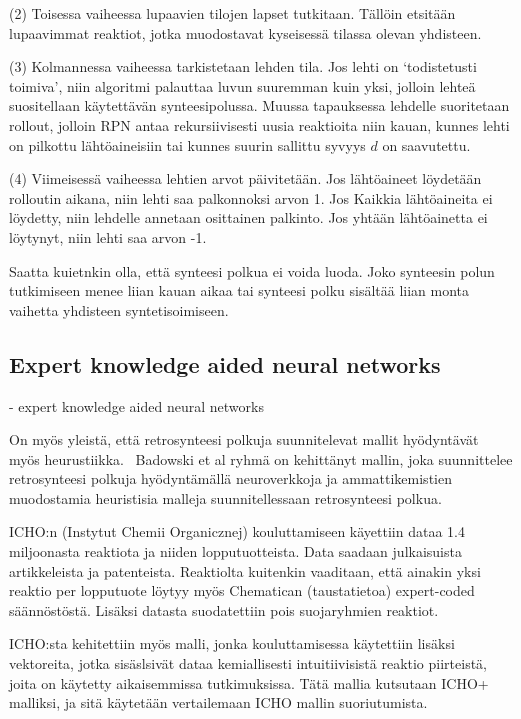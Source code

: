 \documentclass[finnish,twoside,censored,subject,sw-line]{HYthesisML}
\begin{document}
(2) Toisessa vaiheessa lupaavien tilojen lapset tutkitaan. Tällöin etsitään lupaavimmat reaktiot, jotka muodostavat
kyseisessä tilassa olevan yhdisteen.

(3) Kolmannessa vaiheessa tarkistetaan lehden tila. Jos lehti on `todistetusti toimiva', niin algoritmi palauttaa
luvun suuremman kuin yksi, jolloin lehteä suositellaan käytettävän synteesipolussa. Muussa tapauksessa lehdelle
suoritetaan rollout, jolloin RPN antaa rekursiivisesti uusia reaktioita niin kauan, kunnes lehti on pilkottu
lähtöaineisiin tai kunnes suurin sallittu syvyys $d$ on saavutettu.

(4) Viimeisessä vaiheessa lehtien arvot päivitetään. Jos lähtöaineet löydetään rolloutin aikana, niin lehti saa
palkonnoksi arvon 1. Jos Kaikkia lähtöaineita ei löydetty, niin lehdelle annetaan osittainen palkinto. Jos yhtään
lähtöainetta ei löytynyt, niin lehti saa arvon -1.

Saatta kuietnkin olla, että synteesi polkua ei voida luoda. Joko synteesin polun tutkimiseen menee liian kauan
aikaa tai synteesi polku sisältää liian monta vaihetta yhdisteen syntetisoimiseen.

\subsection{Expert knowledge aided neural networks}
- expert knowledge aided neural networks~\cite{ExpertKnowledgeRetorsynthesis}

On myös yleistä, että retrosynteesi polkuja  suunnitelevat mallit hyödyntävät myös heurustiikka.~\cite{ExpertKnowledgeRetorsynthesis}
Badowski et al ryhmä on kehittänyt mallin, joka suunnittelee retrosynteesi polkuja hyödyntämällä neuroverkkoja ja ammattikemistien muodostamia heuristisia malleja suunnitellessaan retrosynteesi polkua.

ICHO:n (Instytut Chemii Organicznej) kouluttamiseen käyettiin dataa 1.4 miljoonasta reaktiota ja niiden lopputuotteista.
Data saadaan julkaisuista artikkeleista ja patenteista.
Reaktiolta kuitenkin vaaditaan, että ainakin yksi reaktio per lopputuote löytyy myös Chematican (taustatietoa) expert-coded säännöstöstä.
Lisäksi datasta suodatettiin pois suojaryhmien reaktiot.

ICHO:sta kehitettiin myös malli, jonka kouluttamisessa käytettiin lisäksi vektoreita, jotka sisäslsivät dataa kemiallisesti intuitiivisistä reaktio piirteistä, joita on käytetty aikaisemmissa tutkimuksissa.
Tätä mallia kutsutaan ICHO+ malliksi, ja sitä käytetään vertailemaan ICHO mallin suoriutumista.
\end{document}
